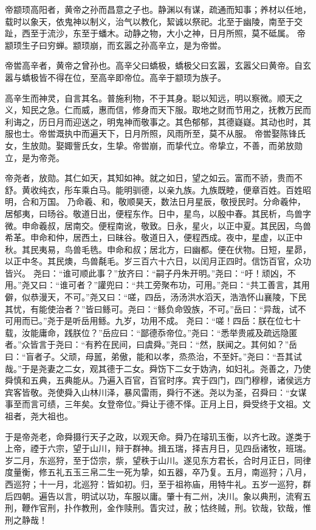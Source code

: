\documentclass[UTF8,12pt,AutoFakeBold]{ctexart}
\begin{document}
\par
帝颛顼高阳者，黄帝之孙而昌意之子也。静渊以有谋，疏通而知事；养材以任地，载时以象天，依鬼神以制义，治气以教化，絜诚以祭祀。北至于幽陵，南至于交趾，西至于流沙，东至于蟠木。动静之物，大小之神，日月所照，莫不砥属。
帝颛顼生子曰穷蝉。颛顼崩，而玄嚣之孙高辛立，是为帝喾。
\par
帝喾高辛者，黄帝之曾孙也。高辛父曰蟜极，蟜极父曰玄嚣，玄嚣父曰黄帝。自玄嚣与蟜极皆不得在位，至高辛即帝位。高辛于颛顼为族子。
\par
高辛生而神灵，自言其名。普施利物，不于其身。聪以知远，明以察微。顺天之义，知民之急。仁而威，惠而信，修身而天下服。取地之财而节用之，抚教万民而利诲之，历日月而迎送之，明鬼神而敬事之。其色郁郁，其德嶷嶷。其动也时，其服也士。帝喾溉执中而遍天下，日月所照，风雨所至，莫不从服。
帝喾娶陈锋氏女，生放勋。娶娵訾氏女，生挚。帝喾崩，而挚代立。帝挚立，不善，而弟放勋立，是为帝尧。
\par
帝尧者，放勋。其仁如天，其知如神。就之如日，望之如云。富而不骄，贵而不舒。黄收纯衣，彤车乘白马。能明驯德，以亲九族。九族既睦，便章百姓。百姓昭明，合和万国。
乃命羲、和，敬顺昊天，数法日月星辰，敬授民时。分命羲仲，居郁夷，曰旸谷。敬道日出，便程东作。日中，星鸟，以殷中春。其民析，鸟兽字微。申命羲叔，居南交。便程南讹，敬致。日永，星火，以正中夏。其民因，鸟兽希革。申命和仲，居西土，曰昧谷。敬道日入，便程西成。夜中，星虚，以正中秋。其民夷易，鸟兽毛毨。申命和叔；居北方，曰幽都。便在伏物。日短，星昴，以正中冬。其民燠，鸟兽氄毛。岁三百六十六日，以闰月正四时。信饬百官，众功皆兴。
尧曰：“谁可顺此事？”放齐曰：“嗣子丹朱开明。”尧曰：“吁！顽凶，不用。”尧又曰：“谁可者？”讙兜曰：“共工旁聚布功，可用。”尧曰：“共工善言，其用僻，似恭漫天，不可。”尧又曰：“嗟，四岳，汤汤洪水滔天，浩浩怀山襄陵，下民其忧，有能使治者？”皆曰鲧可。尧曰：“鲧负命毁族，不可。”岳曰：“异哉，试不可用而已。”尧于是听岳用鲧。九岁，功用不成。
尧曰：“嗟！四岳：朕在位七十载，汝能庸命，践朕位？”岳应曰：“鄙德忝帝位。”尧曰：“悉举贵戚及疏远隐匿者。”众皆言于尧曰：“有矜在民间，曰虞舜。”尧曰：“然，朕闻之。其何如？”岳曰：“盲者子。父顽，母嚚，弟傲，能和以孝，烝烝治，不至奸。”尧曰：“吾其试哉。”于是尧妻之二女，观其德于二女。舜饬下二女于妫汭，如妇礼。尧善之，乃使舜慎和五典，五典能从。乃遍入百官，百官时序。宾于四门，四门穆穆，诸侯远方宾客皆敬。尧使舜入山林川泽，暴风雷雨，舜行不迷。尧以为圣，召舜曰：“女谋事至而言可绩，三年矣。女登帝位。”舜让于德不怿。正月上日，舜受终于文祖。文祖者，尧大祖也。
\par
于是帝尧老，命舜摄行天子之政，以观天命。舜乃在璿玑玉衡，以齐七政。遂类于上帝，禋于六宗，望于山川，辩于群神。揖五瑞，择吉月日，见四岳诸牧，班瑞。岁二月，东巡狩，至于岱宗，祡，望秩于山川。遂见东方君长，合时月正日，同律度量衡，修五礼五玉三帛二生一死为挚，如五器，卒乃复。五月，南巡狩；八月，西巡狩；十一月，北巡狩：皆如初。归，至于祖祢庙，用特牛礼。五岁一巡狩，群后四朝。遍告以言，明试以功，车服以庸。肇十有二州，决川。象以典刑，流宥五刑，鞭作官刑，扑作教刑，金作赎刑。眚灾过，赦；怙终贼，刑。钦哉，钦哉，惟刑之静哉！
\end{document}
